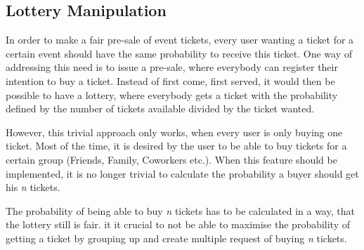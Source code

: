 \subsection{Lottery Manipulation}\label{subsection:lottery-manipulation}
In order to make a fair pre-sale of event tickets, every user wanting a ticket for a certain event should have the same probability to receive this ticket. One way of addressing this need is to issue a pre-sale, where everybody can register their intention to buy a ticket. Instead of first come, first served, it would then be possible to have a lottery, where everybody gets a ticket with the probability defined by the number of tickets available divided by the ticket wanted.

However, this trivial approach only works, when every user is only buying one ticket. Most of the time, it is desired by the user to be able to buy tickets for a certain group (Friends, Family, Coworkers etc.). When this feature should be implemented, it is no longer trivial to calculate the probability a buyer should get his \textit{n} tickets. 

The probability of being able to buy \textit{n} tickets has to be calculated in a way, that the lottery still is fair. it it crucial to not be able to maximise the probability of getting a ticket by grouping up and create multiple request of buying \textit{n} tickets.

